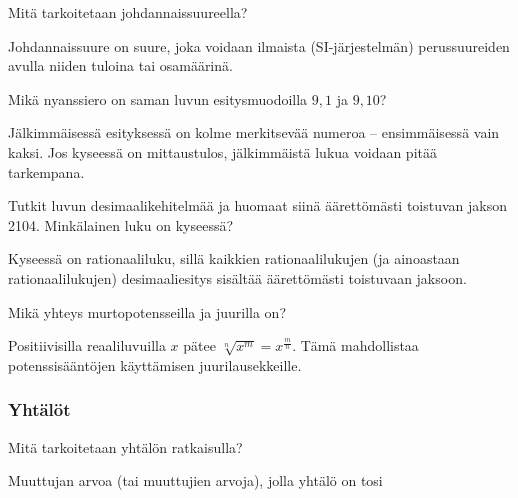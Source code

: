 \begin{tehtava}
Mitä tarkoitetaan johdannaissuureella?
\begin{vastaus}
Johdannaissuure on suure, joka voidaan ilmaista (SI-järjestelmän) perussuureiden avulla niiden tuloina tai osamäärinä.
\end{vastaus}
\end{tehtava}

\begin{tehtava}
Mikä nyanssiero on saman luvun esitysmuodoilla $9,1$ ja $9,10$?
\begin{vastaus}
Jälkimmäisessä esityksessä on kolme merkitsevää numeroa -- ensimmäisessä vain kaksi. Jos kyseessä on mittaustulos, jälkimmäistä lukua voidaan pitää tarkempana.
\end{vastaus}
\end{tehtava}

\begin{tehtava}
Tutkit luvun desimaalikehitelmää ja huomaat siinä äärettömästi toistuvan jakson 2104. Minkälainen luku on kyseessä?
\begin{vastaus}
Kyseessä on rationaaliluku, sillä kaikkien rationaalilukujen (ja ainoastaan rationaalilukujen) desimaaliesitys sisältää äärettömästi toistuvaan jaksoon.
\end{vastaus}
\end{tehtava}

\begin{tehtava}
Mikä yhteys murtopotensseilla ja juurilla on?
\begin{vastaus}
Positiivisilla reaaliluvuilla $x$ pätee $\sqrt[n]{x^m} = x^{\frac{m}{n}}$. Tämä mahdollistaa potenssisääntöjen käyttämisen juurilausekkeille.
\end{vastaus}
\end{tehtava}

\subsubsection*{Yhtälöt}

\begin{tehtava}
Mitä tarkoitetaan yhtälön ratkaisulla?
\begin{vastaus}
Muuttujan arvoa (tai muuttujien arvoja), jolla yhtälö on tosi
\end{vastaus}
\end{tehtava}

